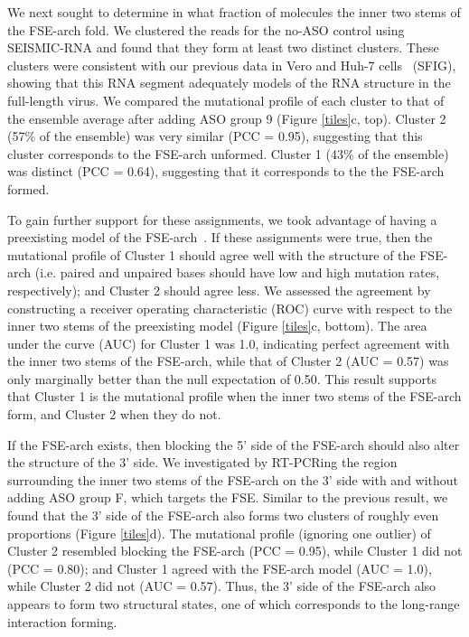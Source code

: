 \documentclass[main.tex]{subfiles}
\begin{document}
We next sought to determine in what fraction of molecules the inner two stems of the FSE-arch fold.
We clustered the reads for the no-ASO control using SEISMIC-RNA and found that they form at least two distinct clusters.
These clusters were consistent with our previous data in Vero and Huh-7 cells~\cite{Lan2022} (SFIG), showing that this RNA segment adequately models of the RNA structure in the full-length virus.
We compared the mutational profile of each cluster to that of the ensemble average after adding ASO group 9 (Figure \ref{tiles}c, top).
Cluster 2 (57\% of the ensemble) was very similar (PCC = 0.95), suggesting that this cluster corresponds to the FSE-arch unformed.
Cluster 1 (43\% of the ensemble) was distinct (PCC = 0.64), suggesting that it corresponds to the the FSE-arch formed.

To gain further support for these assignments, we took advantage of having a preexisting model of the FSE-arch~\cite{Ziv2020}.
If these assignments were true, then the mutational profile of Cluster 1 should agree well with the structure of the FSE-arch (i.e. paired and unpaired bases should have low and high mutation rates, respectively); and Cluster 2 should agree less.
We assessed the agreement by constructing a receiver operating characteristic (ROC) curve with respect to the inner two stems of the preexisting model (Figure \ref{tiles}c, bottom).
The area under the curve (AUC) for Cluster 1 was 1.0, indicating perfect agreement with the inner two stems of the FSE-arch, while that of Cluster 2 (AUC = 0.57) was only marginally better than the null expectation of 0.50.
This result supports that Cluster 1 is the mutational profile when the inner two stems of the FSE-arch form, and Cluster 2 when they do not.

If the FSE-arch exists, then blocking the 5' side of the FSE-arch should also alter the structure of the 3' side.
We investigated by RT-PCRing the region surrounding the inner two stems of the FSE-arch on the 3' side with and without adding ASO group F, which targets the FSE.
Similar to the previous result, we found that the 3' side of the FSE-arch also forms two clusters of roughly even proportions (Figure \ref{tiles}d).
The mutational profile (ignoring one outlier) of Cluster 2 resembled blocking the FSE-arch (PCC = 0.95), while Cluster 1 did not (PCC = 0.80); and Cluster 1 agreed with the FSE-arch model (AUC = 1.0), while Cluster 2 did not (AUC = 0.57).
Thus, the 3' side of the FSE-arch also appears to form two structural states, one of which corresponds to the long-range interaction forming.
\end{document}
